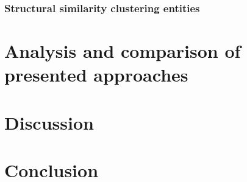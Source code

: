 \documentclass[runningheads]{llncs}
\begin{document}
\subsubsection{Structural similarity clustering entities}

\section{Analysis and comparison of presented approaches}
\section{Discussion}
\section{Conclusion}
\end{document}

